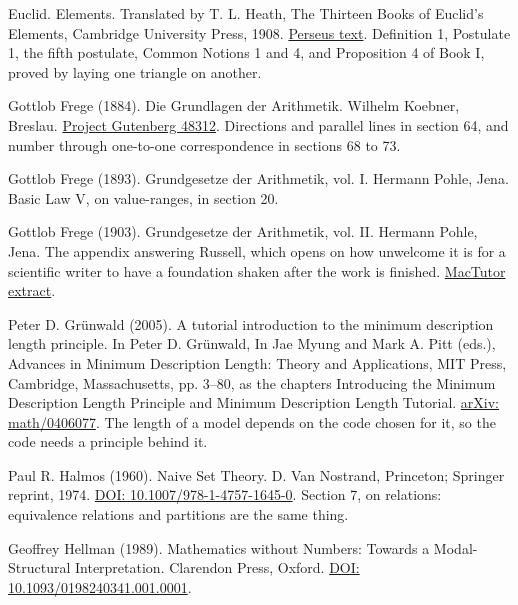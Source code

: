 \noindent Euclid. Elements. Translated by T. L. Heath, The Thirteen Books of Euclid's Elements, Cambridge University Press, 1908. \href{http://www.perseus.tufts.edu/hopper/text?doc=Perseus:text:1999.01.0086}{Perseus text}. Definition 1, Postulate 1, the fifth postulate, Common Notions 1 and 4, and Proposition 4 of Book I, proved by laying one triangle on another.
\par\medskip

\noindent Gottlob Frege (1884). Die Grundlagen der Arithmetik. Wilhelm Koebner, Breslau. \href{https://www.gutenberg.org/ebooks/48312}{Project Gutenberg 48312}. Directions and parallel lines in section 64, and number through one-to-one correspondence in sections 68 to 73.
\par\medskip

\noindent Gottlob Frege (1893). Grundgesetze der Arithmetik, vol. I. Hermann Pohle, Jena. Basic Law V, on value-ranges, in section 20.
\par\medskip

\noindent Gottlob Frege (1903). Grundgesetze der Arithmetik, vol. II. Hermann Pohle, Jena. The appendix answering Russell, which opens on how unwelcome it is for a scientific writer to have a foundation shaken after the work is finished. \href{https://mathshistory.st-andrews.ac.uk/Bookpages/Frege10.html}{MacTutor extract}.
\par\medskip

\noindent Peter D. Gr\"unwald (2005). A tutorial introduction to the minimum description length principle. In Peter D. Gr\"unwald, In Jae Myung and Mark A. Pitt (eds.), Advances in Minimum Description Length: Theory and Applications, MIT Press, Cambridge, Massachusetts, pp. 3--80, as the chapters Introducing the Minimum Description Length Principle and Minimum Description Length Tutorial. \href{https://arxiv.org/abs/math/0406077}{arXiv: math/0406077}. The length of a model depends on the code chosen for it, so the code needs a principle behind it.
\par\medskip

\noindent Paul R. Halmos (1960). Naive Set Theory. D. Van Nostrand, Princeton; Springer reprint, 1974. \href{https://doi.org/10.1007/978-1-4757-1645-0}{DOI: 10.1007/978-1-4757-1645-0}. Section 7, on relations: equivalence relations and partitions are the same thing.
\par\medskip

\noindent Geoffrey Hellman (1989). Mathematics without Numbers: Towards a Modal-Structural Interpretation. Clarendon Press, Oxford. \href{https://doi.org/10.1093/0198240341.001.0001}{DOI: 10.1093/0198240341.001.0001}.
\par\medskip

